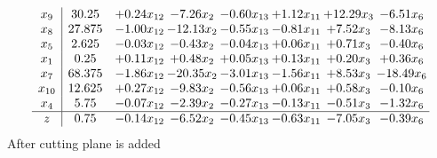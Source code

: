 \documentclass[8pt]{article}
\begin{document}
\[\begin{array}{c| c c@{\hskip 2pt} c@{\hskip 2pt} c@{\hskip 2pt} c@{\hskip 2pt} c@{\hskip 2pt} c@{\hskip 2pt} }
 x_{9}   &  30.25 & +  0.24 x_{12} & -7.26 x_{2} & -0.60 x_{13} & +  1.12 x_{11} & + 12.29 x_{3} & -6.51 x_{6}\\
 x_{8}   &  27.875 & -1.00 x_{12} & -12.13 x_{2} & -0.55 x_{13} & -0.81 x_{11} & +  7.52 x_{3} & -8.13 x_{6}\\
 x_{5}   &  2.625 & -0.03 x_{12} & -0.43 x_{2} & -0.04 x_{13} & +  0.06 x_{11} & +  0.71 x_{3} & -0.40 x_{6}\\
 x_{1}   &  0.25 & +  0.11 x_{12} & +  0.48 x_{2} & +  0.05 x_{13} & +  0.13 x_{11} & +  0.20 x_{3} & +  0.36 x_{6}\\
 x_{7}   &  68.375 & -1.86 x_{12} & -20.35 x_{2} & -3.01 x_{13} & -1.56 x_{11} & +  8.53 x_{3} & -18.49 x_{6}\\
 x_{10}   &  12.625 & +  0.27 x_{12} & -9.83 x_{2} & -0.56 x_{13} & +  0.06 x_{11} & +  0.58 x_{3} & -0.10 x_{6}\\
 x_{4}   &  5.75 & -0.07 x_{12} & -2.39 x_{2} & -0.27 x_{13} & -0.13 x_{11} & -0.51 x_{3} & -1.32 x_{6}\\
\hline
z    &  0.75 & -0.14 x_{12} & -6.52 x_{2} & -0.45 x_{13} & -0.63 x_{11} & -7.05 x_{3} & -0.39 x_{6}\\
\end{array}\]
 After cutting plane is added 
\end{document}
